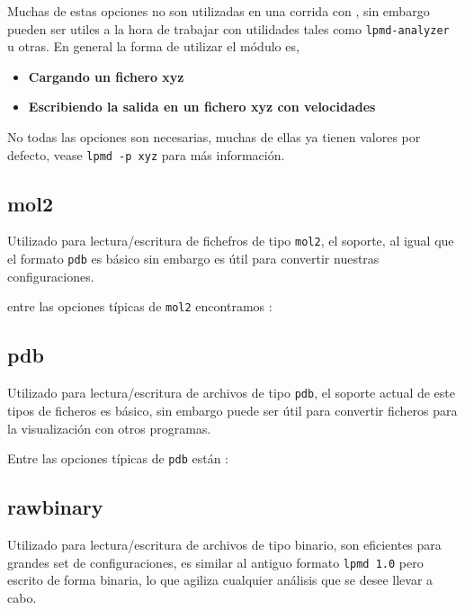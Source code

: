 Muchas de estas opciones no son utilizadas en una corrida con {\lpmd}, sin embargo pueden ser utiles a la hora de trabajar con utilidades tales como \verb|lpmd-analyzer| u otras. En general la forma de utilizar el m\'odulo es,

\begin{itemize}
 \item \textbf{Cargando un fichero xyz}
 \item \textbf{Escribiendo la salida en un fichero xyz con velocidades}
\end{itemize}

No todas las opciones son necesarias, muchas de ellas ya tienen valores por defecto, vease \verb|lpmd -p xyz| para m\'as informaci\'on.

\subsection{mol2}
Utilizado para lectura/escritura de fichefros de tipo \verb|mol2|, el soporte, al igual que el formato \verb|pdb| es b\'asico sin embargo es \'util para convertir nuestras configuraciones.

entre las opciones t\'ipicas de \verb|mol2| encontramos :


\subsection{pdb}
Utilizado para lectura/escritura de archivos de tipo \verb|pdb|, el soporte actual de este tipos de ficheros es b\'asico, sin embargo puede ser \'util para convertir ficheros para la visualizaci\'on con otros programas.

Entre las opciones t\'ipicas de \verb|pdb| est\'an :


\subsection{rawbinary}
Utilizado para lectura/escritura de archivos de tipo binario, son eficientes para grandes set de configuraciones, es similar al antiguo formato \verb|lpmd 1.0| pero escrito de forma binaria, lo que agiliza cualquier an\'alisis que se desee llevar a cabo.


